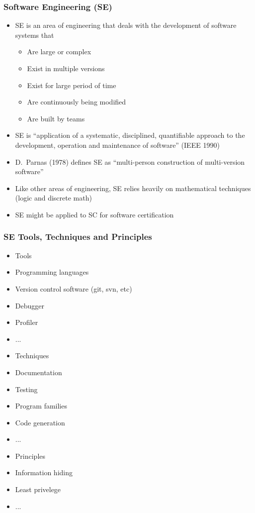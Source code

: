 \documentclass[t,12pt,numbers,fleqn]{beamer}
\begin{document}

\begin{frame}
\frametitle{Software Engineering (SE)}

\begin{itemize}
\item SE is an area of engineering that deals with the development of software
  systems that
\begin{itemize}
\item Are large or complex
\item Exist in multiple versions
\item Exist for large period of time
\item Are continuously being modified
\item Are built by teams
\end{itemize}
\item SE is ``application of a systematic, disciplined, quantifiable approach to
  the development, operation and maintenance of software'' (IEEE 1990)
\item D.\ Parnas (1978) defines SE as ``multi-person
  construction of multi-version software''
\item Like other areas of engineering, SE relies heavily on
  mathematical techniques (logic and discrete math)
\item SE might be applied to SC for software certification
\end{itemize}

\end{frame}


\begin{frame}
\frametitle{SE Tools, Techniques and Principles}

\begin{itemize}
\item Tools
\bi
\item Programming languages
\item Version control software (git, svn, etc)
\item Debugger
\item Profiler
\item ...
\ei
\item Techniques
\bi
\item Documentation
\item Testing
\item Program families
\item Code generation
\item ...
\ei
\item Principles
\bi
\item Information hiding
\item Least privelege
\item ...
\ei
\end{itemize}

\end{frame}
\end{document}
